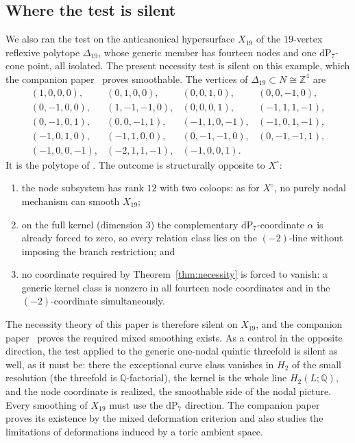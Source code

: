 \documentclass[11pt]{amsart}
\theoremstyle{definition}
\theoremstyle{remark}
\theoremstyle{plain}
\newcommand{\ZZ}{\mathbb{Z}}
\newcommand{\QQ}{\mathbb{Q}}
\newcommand{\dP}{\mathrm{dP}}
\begin{document}
\subsection{Where the test is silent}\label{sec:X19}
We also ran the test on the anticanonical hypersurface $X_{19}$ of the
$19$-vertex reflexive polytope $\Delta_{19}$, whose generic member has fourteen
nodes and one $\dP_7$-cone point, all isolated.  The present necessity test is silent on this example, which the
companion paper~\cite{PaperV} proves smoothable.  The vertices of
$\Delta_{19}\subset N\cong\ZZ^4$ are
\[
\begin{array}{llll}
(1,0,0,0), & (0,1,0,0), & (0,0,1,0), & (0,0,-1,0),\\
(0,-1,0,0), & (1,-1,-1,0), & (0,0,0,1), & (-1,1,1,-1),\\
(0,-1,0,1), & (0,0,-1,1), & (-1,1,0,-1), & (-1,0,1,-1),\\
(-1,0,1,0), & (-1,1,0,0), & (0,-1,-1,0), & (0,-1,-1,1),\\
(-1,0,0,-1), & (-2,1,1,-1), & (-1,0,0,1). &
\end{array}
\]
It is the polytope of \cite[Section~5.3]{PaperIII}.  The outcome is
structurally opposite to $X^{\circ}$:
\begin{enumerate}
\item the node subsystem has rank $12$ with two coloops: as for
$X^{\circ}$, no purely nodal mechanism can smooth $X_{19}$;
\item on the full kernel (dimension $3$) the complementary
$\dP_7$-coordinate $\alpha$ is already forced to zero, so every
relation class lies on the $(-2)$-line without imposing the branch
restriction; and
\item no coordinate required by Theorem~\ref{thm:necessity} is forced to
vanish: a generic kernel class is
nonzero in all fourteen node coordinates and in the $(-2)$-coordinate
simultaneously.
\end{enumerate}
The necessity theory of this paper is therefore silent on $X_{19}$,
and the companion paper~\cite{PaperV} proves the required mixed
smoothing exists.  As a control in the opposite
direction, the test applied to the generic one-nodal quintic
threefold is silent as well, as it must be: there the exceptional
curve class vanishes in $H_2$ of the small resolution (the threefold
is $\QQ$-factorial), the kernel is the whole line $H_2(L;\QQ)$, and
the node coordinate is realized, the smoothable side of the nodal
picture.  Every smoothing of $X_{19}$ must use the $\dP_7$ direction.
The companion paper~\cite{PaperV} proves its existence by the mixed
deformation criterion and also studies the limitations of deformations
induced by a toric ambient space.
\end{document}
